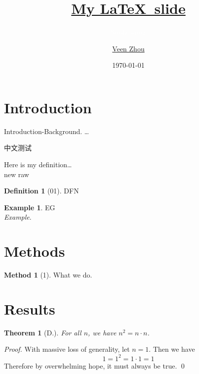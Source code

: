 \documentclass[aspectratio=169]{beamer}	%
\title{\textcolor{white}{\href{https://github.com/Veenxz/My_Beamer}{My \LaTeX\ slide}}}
\subtitle{\textcolor{white}{Subheading}}
\author{ \href {mailto:veenzhou@gmail.com}{Veen Zhou}}
\date{\footnotesize \today}
\newcommand{\pf}{\noindent\emph{Proof. }}
\theoremstyle{plain}
\newtheorem{thm}{Theorem}[section]
\theoremstyle{definition}
\newtheorem{ex}{Example}[section]
\newtheorem{dfn}{Definition}[section]
\newtheorem{met}{Method}[section]
\theoremstyle{remark}
\numberwithin{equation}{section}
\begin{document}
\begin{frame}
\titlepage
\end{frame}



\section{Introduction}



\begin{frame}
Introduction-Background. \dots \\
\begin{CJK}{UTF8}{gbsn}   %
中文测试\\%
\end{CJK}
\end{frame}



\begin{frame}
Here is my definition\dots \\
new raw

\begin{dfn}[01]
DFN
\end{dfn}

\begin{ex}
EG\\
\emph{Example}.
\end{ex}
\end{frame}



\section{Methods}



\begin{frame}
\begin{met}[1]
What we do.
\end{met}
\end{frame}



\section{Results}



\begin{frame}
\begin{thm}[D.]
For all $n$, we have $n^2= n \cdot n$.
\end{thm}

\pf With massive loss of generality, let $n=1$. Then we have
	\[
	1=1^2= 1 \cdot 1= 1
	\]
Therefore by overwhelming hope, it must always be true. \qed
\end{frame}
\end{document}
